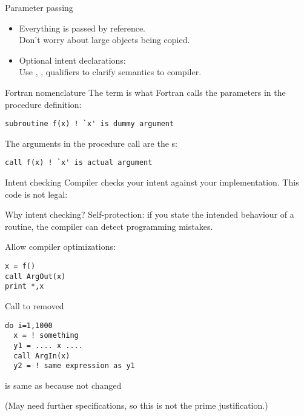 \begin{block}{Parameter passing}
  \label{sl:fpassing}
  \begin{itemize}
  \item Everything is passed by reference.\\
    Don't worry about large objects being copied.
  \item Optional intent declarations:\\
    Use , ,  qualifiers to clarify semantics
    to compiler.
  \end{itemize}
\end{block}

\begin{block}{Fortran nomenclature}
  \label{sl:fortran-dummy}
  The term  is what Fortran calls the
  parameters in the procedure definition:
\begin{lstlisting}
subroutine f(x) ! `x' is dummy argument
\end{lstlisting}
  The arguments in the
  procedure call are the s:
\begin{lstlisting}
call f(x) ! `x' is actual argument
\end{lstlisting}
\end{block}

\begin{block}{Intent checking}
  \label{sl:fintent}
  Compiler checks your intent against your implementation. This code
  is not legal:

\end{block}

\begin{block}{Why intent checking?}
\label{sl:intentwhy}
Self-protection: if you state the intended behaviour of a routine, the
compiler can detect programming mistakes.

Allow compiler optimizations:

\begin{multicols}{2}
\begin{lstlisting}
x = f()
call ArgOut(x)
print *,x
\end{lstlisting}
Call to  removed
\vfill\columnbreak
\begin{lstlisting}
do i=1,1000
  x = ! something
  y1 = .... x ....
  call ArgIn(x)
  y2 = ! same expression as y1
\end{lstlisting}
 is same as  because  not changed
\end{multicols}
(May need further specifications, so this is not the prime justification.)
\end{block}


